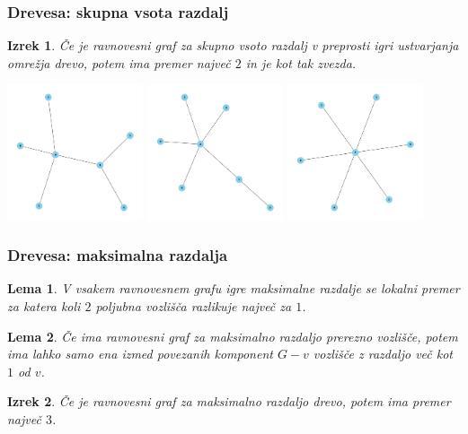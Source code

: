 \documentclass[12pt, hyperref={unicode}]{beamer}
\newtheorem{izrek}{Izrek}
\newtheorem{lema}{Lema}
\begin{document}
\begin{frame}

  \frametitle{Drevesa: skupna vsota razdalj}
  \begin{izrek}
    Če je ravnovesni graf za skupno vsoto razdalj v preprosti igri ustvarjanja
    omrežja drevo, potem ima premer največ $2$ in je kot tak zvezda.
  \end{izrek}

  \includegraphics[width=0.3\textwidth]{drevo_1.png}
  \includegraphics[width=0.3\textwidth]{drevo_2.png}
  \includegraphics[width=0.3\textwidth]{drevo_3.png}
\end{frame}

\begin{frame}
   
  \frametitle{Drevesa: maksimalna razdalja}
  \begin{lema}
    V vsakem ravnovesnem grafu igre maksimalne razdalje se lokalni premer za
    katera koli $2$ poljubna vozlišča razlikuje največ za $1$.
  \end{lema}

  \begin{lema}
    Če ima ravnovesni graf za maksimalno razdaljo prerezno vozlišče, potem ima lahko
    samo ena izmed povezanih komponent $G - v$ vozlišče z razdaljo več kot $1$ od $v$.
  \end{lema}

  \begin{izrek}
    Če je ravnovesni graf za maksimalno razdaljo drevo, potem ima premer največ $3$.
  \end{izrek}

\end{frame}
\end{document}
